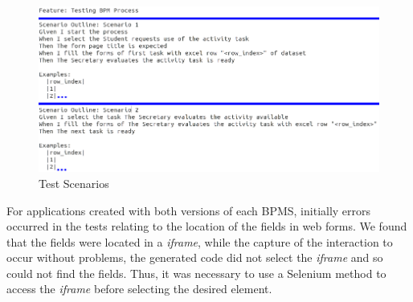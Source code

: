 \documentclass[runningheads,a4paper]{llncs}
\begin{document}
\begin{figure}[ht]
\centering
\includegraphics[width=1\textwidth]{figuras/cenario_traduzido2.png}
\caption{Test Scenarios}
\label{fig:cenario2}
\end{figure}


For applications created with both versions of each BPMS, initially errors occurred in the tests relating to the location of the fields in web forms. We found that the fields were located in a \emph{iframe}, while the capture of the interaction to occur without problems, the generated code did not select the \emph{iframe} and so could not find the fields. Thus, it was necessary to use a Selenium method to access the \emph{iframe} before selecting the desired element.

\end{document}
